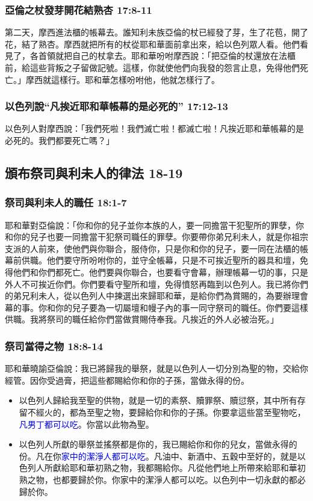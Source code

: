 \subsubsection{亞倫之杖發芽開花結熟杏 17:8-11}
第二天，摩西進法櫃的帳幕去。誰知利未族亞倫的杖已經發了芽，生了花苞，開了花，結了熟杏。摩西就把所有的杖從耶和華面前拿出來，給以色列眾人看。他們看見了，各首領就把自己的杖拿去。耶和華吩咐摩西說：「把亞倫的杖還放在法櫃前，給這些背叛之子留做記號。這樣，你就使他們向我發的怨言止息，免得他們死亡。」摩西就這樣行。耶和華怎樣吩咐他，他就怎樣行了。

\subsubsection{以色列說“凡挨近耶和華帳幕的是必死的” 17:12-13}
以色列人對摩西說：「我們死啦！我們滅亡啦！都滅亡啦！凡挨近耶和華帳幕的是必死的。我們都要死亡嗎？」

\subsection{頒布祭司與利未人的律法 18-19 }
\subsubsection{祭司與利未人的職任 18:1-7 }
\noindent
耶和華對亞倫說：「你和你的兒子並你本族的人，要一同擔當干犯聖所的罪孽，你和你的兒子也要一同擔當干犯祭司職任的罪孽。你要帶你弟兄利未人，就是你祖宗支派的人前來，使他們與你聯合，服侍你，只是你和你的兒子，要一同在法櫃的帳幕前供職。他們要守所吩咐你的，並守全帳幕，只是不可挨近聖所的器具和壇，免得他們和你們都死亡。他們要與你聯合，也要看守會幕，辦理帳幕一切的事，只是外人不可挨近你們。你們要看守聖所和壇，免得憤怒再臨到以色列人。我已將你們的弟兄利未人，從以色列人中揀選出來歸耶和華，是給你們為賞賜的，為要辦理會幕的事。你和你的兒子要為一切屬壇和幔子內的事一同守祭司的職任。你們要這樣供職。我將祭司的職任給你們當做賞賜侍奉我。凡挨近的外人必被治死。」

\subsubsection{祭司當得之物  18:8-14 }
耶和華曉諭亞倫說：我已將歸我的舉祭，就是以色列人一切分別為聖的物，交給你經管。因你受過膏，把這些都賜給你和你的子孫，當做永得的份。
\begin{itemize} 
\itemsep-.25em  
\item 以色列人歸給我至聖的供物，就是一切的素祭、贖罪祭、贖愆祭，其中所有存留不經火的，都為至聖之物，要歸給你和你的子孫。你要拿這些當至聖物吃，\textcolor{blue}{凡男丁都可以吃}。你當以此物為聖。
\item 以色列人所獻的舉祭並搖祭都是你的，我已賜給你和你的兒女，當做永得的份。凡在你\textcolor{blue}{家中的潔淨人都可以吃}。凡油中、新酒中、五穀中至好的，就是以色列人所獻給耶和華初熟之物，我都賜給你。凡從他們地上所帶來給耶和華初熟之物，也都要歸於你。你家中的潔淨人都可以吃。以色列中一切永獻的都必歸於你。 
\end{itemize}

